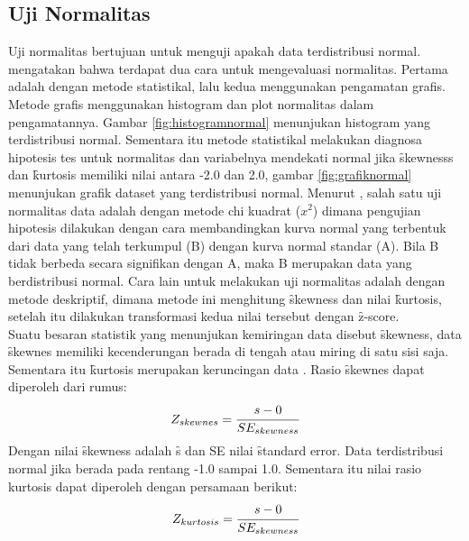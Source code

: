\subsection{Uji Normalitas}
Uji normalitas bertujuan untuk menguji apakah data terdistribusi normal. \citet{ppt.schwab} mengatakan bahwa terdapat dua cara untuk mengevaluasi normalitas. Pertama adalah dengan metode statistikal, lalu kedua menggunakan pengamatan grafis. Metode grafis menggunakan histogram dan plot normalitas dalam pengamatannya. Gambar \ref{fig:histogramnormal} menunjukan histogram yang terdistribusi normal. Sementara itu metode statistikal melakukan diagnosa hipotesis tes untuk normalitas dan variabelnya mendekati normal jika \f{skewnesss} dan \f{kurtosis} memiliki nilai antara -2.0 dan 2.0, gambar \ref{fig:grafiknormal} menunjukan grafik dataset yang terdistribusi normal. Menurut \citet{buku.sugiyono}, salah satu uji normalitas data adalah dengan metode chi kuadrat ($x^2$) dimana pengujian hipotesis dilakukan dengan cara membandingkan kurva normal yang terbentuk dari data yang telah terkumpul (B) dengan kurva normal standar (A). Bila B tidak berbeda secara signifikan dengan A, maka B merupakan data yang berdistribusi normal. Cara lain untuk melakukan uji normalitas adalah dengan metode deskriptif, dimana metode ini menghitung \f{skewness} dan nilai \f{kurtosis}, setelah itu dilakukan transformasi kedua nilai tersebut dengan \f{z-score}. 
\newline\\
Suatu besaran statistik yang menunjukan kemiringan data disebut \f{skewness}, data \f{skewnes} memiliki kecenderungan berada di tengah atau miring di satu sisi saja. Sementara itu \f{kurtosis} merupakan keruncingan data \citep{article.setiawan}. Rasio \f{skewnes} dapat diperoleh dari rumus:
\begin{equation}
\centering
 Z_{skewnes} = \cfrac{s-0}{SE_{skewness}} 
\end{equation}
Dengan nilai \f{skewness} adalah \f{s} dan SE nilai \f{standard error}. Data terdistribusi normal jika berada pada rentang -1.0 sampai 1.0. Sementara itu nilai rasio kurtosis dapat diperoleh dengan persamaan berikut:
\begin{equation}
\centering
Z_{kurtosis} = \cfrac{s-0}{SE_{skewness}} 
\end{equation}

